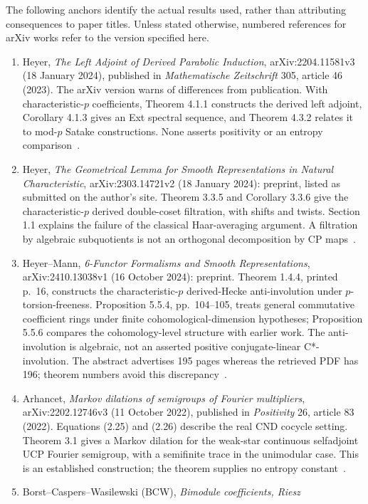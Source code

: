 \documentclass[11pt]{article}
\theoremstyle{remark}\newtheorem{remark}[definition]{Remark}
\begin{document}
The following anchors identify the actual results used, rather than attributing
consequences to paper titles. Unless stated otherwise, numbered references for
arXiv works refer to the version specified here.
\begin{enumerate}
\item Heyer, \emph{The Left Adjoint of Derived Parabolic Induction},
arXiv:2204.11581v3 (18 January 2024), published in \emph{Mathematische
Zeitschrift} 305, article 46 (2023). The arXiv version warns of differences
from publication. With characteristic-$p$ coefficients, Theorem 4.1.1
constructs the derived left adjoint, Corollary 4.1.3 gives an Ext spectral
sequence, and Theorem 4.3.2 relates it to mod-$p$ Satake constructions.
None asserts positivity or an entropy comparison~\cite{HeyerLeft2023}.
\item Heyer, \emph{The Geometrical Lemma for Smooth Representations in Natural
Characteristic}, arXiv:2303.14721v2 (18 January 2024): preprint, listed as
submitted on the author's site. Theorem 3.3.5 and Corollary 3.3.6 give the
characteristic-$p$ derived double-coset filtration, with shifts and twists.
Section 1.1 explains the failure of the classical Haar-averaging argument.
A filtration by algebraic subquotients is not an orthogonal decomposition
by CP maps~\cite{HeyerGeometrical2023}.
\item Heyer--Mann, \emph{6-Functor Formalisms and Smooth Representations},
arXiv:2410.13038v1 (16 October 2024): preprint. Theorem 1.4.4, printed p.~16,
constructs the characteristic-$p$ derived-Hecke anti-involution under
$p$-torsion-freeness. Proposition 5.5.4, pp.~104--105, treats general
commutative coefficient rings under finite cohomological-dimension hypotheses;
Proposition 5.5.6 compares the cohomology-level structure with earlier work.
The anti-involution is algebraic, not an asserted positive conjugate-linear
C*-involution. The abstract advertises 195 pages whereas the retrieved PDF
has 196; theorem numbers avoid this discrepancy~\cite{HeyerMann2024}.
\item Arhancet, \emph{Markov dilations of semigroups of Fourier multipliers},
arXiv:2202.12746v3 (11 October 2022), published in \emph{Positivity} 26,
article 83 (2022). Equations (2.25) and (2.26) describe the real CND cocycle
setting. Theorem 3.1 gives a Markov dilation for the weak-star continuous
selfadjoint UCP Fourier semigroup, with a semifinite trace in the unimodular
case. This is an established construction; the theorem supplies no entropy
constant~\cite{Arhancet2022}.
\item Borst--Caspers--Wasilewski (BCW), \emph{Bimodule coefficients, Riesz
}
\end{enumerate}
\end{document}
